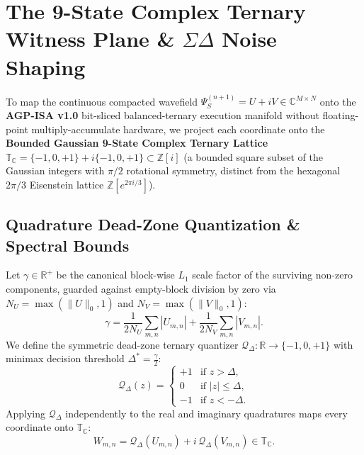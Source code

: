\documentclass[10pt, twocolumn, a4paper]{article}
\begin{document}
\section{The 9-State Complex Ternary Witness Plane \& \texorpdfstring{$\Sigma\Delta$}{Sigma-Delta} Noise Shaping}

To map the continuous compacted wavefield $\Psi_S^{(n+1)} = U + iV \in \mathbb{C}^{M \times N}$ onto the \textbf{AGP-ISA v1.0} bit-sliced balanced-ternary execution manifold without floating-point multiply-accumulate hardware, we project each coordinate onto the \textbf{Bounded Gaussian 9-State Complex Ternary Lattice} $\mathbb{T}_{\mathbb{C}} = \{-1, 0, +1\} + i\{-1, 0, +1\} \subset \mathbb{Z}[i]$ (a bounded square subset of the Gaussian integers with $\pi/2$ rotational symmetry, distinct from the hexagonal $2\pi/3$ Eisenstein lattice $\mathbb{Z}[e^{2\pi i/3}]$).

\subsection{Quadrature Dead-Zone Quantization \& Spectral Bounds}
Let $\gamma \in \mathbb{R}^+$ be the canonical block-wise $L_1$ scale factor of the surviving non-zero components, guarded against empty-block division by zero via $N_U = \max(\|U\|_0, 1)$ and $N_V = \max(\|V\|_0, 1)$:
\begin{equation}
\gamma = \frac{1}{2 N_U} \sum_{m,n} |U_{m,n}| + \frac{1}{2 N_V} \sum_{m,n} |V_{m,n}|.
\label{eq:gamma_scale}
\end{equation}
We define the symmetric dead-zone ternary quantizer $\mathcal{Q}_{\Delta} : \mathbb{R} \to \{-1, 0, +1\}$ with minimax decision threshold $\Delta^* = \frac{\gamma}{2}$:
\begin{equation}
\mathcal{Q}_{\Delta}(z) = \begin{cases} +1 & \text{if } z > \Delta, \\ 0 & \text{if } |z| \le \Delta, \\ -1 & \text{if } z < -\Delta. \end{cases}
\label{eq:deadzone}
\end{equation}
Applying $\mathcal{Q}_{\Delta}$ independently to the real and imaginary quadratures maps every coordinate onto $\mathbb{T}_{\mathbb{C}}$:
\begin{equation}
W_{m,n} = \mathcal{Q}_{\Delta}(U_{m,n}) + i \, \mathcal{Q}_{\Delta}(V_{m,n}) \in \mathbb{T}_{\mathbb{C}}.
\label{eq:complex_quant}
\end{equation}
\end{document}
